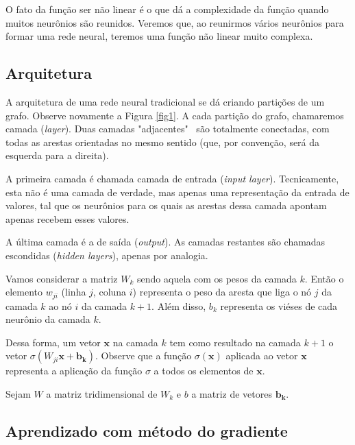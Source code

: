 \documentclass{article}
\begin{document}
            O fato da função ser não linear é o que dá a complexidade da função quando muitos neurônios são reunidos.
            Veremos que, ao reunirmos vários neurônios para formar uma rede neural, teremos uma função não linear muito complexa.

        \subsection{Arquitetura}

            A arquitetura de uma rede neural tradicional se dá criando partições de um grafo.
            Observe novamente a Figura \ref{fig1}.
            A cada partição do grafo, chamaremos camada (\textit{layer}).
            Duas camadas "adjacentes" \ são totalmente conectadas, com todas as arestas orientadas no mesmo sentido (que, por convenção, será da esquerda para a direita).

            A primeira camada é chamada camada de entrada (\textit{input layer}).
            Tecnicamente, esta não é uma camada de verdade, mas apenas uma representação da entrada de valores, tal que os neurônios para os quais as arestas dessa camada apontam apenas recebem esses valores.
            
            A última camada é a de saída (\textit{output}).
            As camadas restantes são chamadas escondidas (\textit{hidden layers}), apenas por analogia.

            Vamos considerar a matriz $W_k$ sendo aquela com os pesos da camada $k$.
            Então o elemento $w_{ji}$ (linha $j$, coluna $i$) representa o peso da aresta que liga o nó $j$ da camada $k$ ao nó $i$ da camada $k + 1$.
            Além disso, $b_k$ representa os viéses de cada neurônio da camada $k$.
            
            Dessa forma, um vetor $\mathbf{x}$ na camada $k$ tem como resultado na camada $k + 1$ o vetor $\sigma (W_{ji} \mathbf{x} + \mathbf{b_k})$.
            Observe que a função $\sigma(\mathbf{x})$ aplicada ao vetor $\mathbf{x}$ representa a aplicação da função $\sigma$ a todos os elementos de $\mathbf{x}$.

            Sejam $W$ a matriz tridimensional de $W_k$ e $b$ a matriz de vetores $\mathbf{b_k}$.

        \subsection{Aprendizado com método do gradiente}
        
\end{document}
